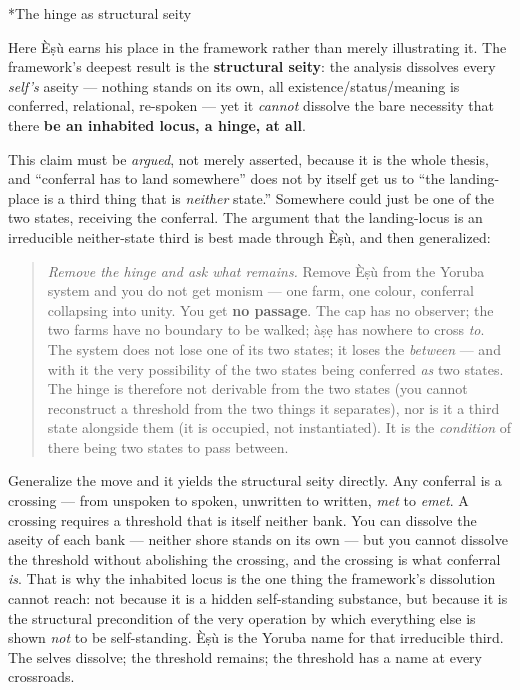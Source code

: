 \documentclass[11pt]{article}
\makeatletter
\renewcommand\paragraph{\@startsection{paragraph}{4}{\z@}{2ex plus 1ex}{0.4ex}{\normalfont\normalsize\bfseries}}
\makeatother
\begin{document}
\paragraph*{The hinge as structural seity}

Here Èṣù earns his place in the framework rather than merely illustrating it. The framework's deepest result is the \textbf{structural seity}: the analysis dissolves every \emph{self's} aseity — nothing stands on its own, all existence/\allowbreak{}status/\allowbreak{}meaning is conferred, relational, re-spoken — yet it \emph{cannot} dissolve the bare necessity that there \textbf{be an inhabited locus, a hinge, at all}.

This claim must be \emph{argued}, not merely asserted, because it is the whole thesis, and ``conferral has to land somewhere'' does not by itself get us to ``the landing-place is a third thing that is \emph{neither} state.'' Somewhere could just be one of the two states, receiving the conferral. The argument that the landing-locus is an irreducible neither-state third is best made through Èṣù, and then generalized:

\begin{quote}
\emph{Remove the hinge and ask what remains.} Remove Èṣù from the Yoruba system and you do not get monism — one farm, one colour, conferral collapsing into unity. You get \textbf{no passage}. The cap has no observer; the two farms have no boundary to be walked; àṣẹ has nowhere to cross \emph{to}. The system does not lose one of its two states; it loses the \emph{between} — and with it the very possibility of the two states being conferred \emph{as} two states. The hinge is therefore not derivable from the two states (you cannot reconstruct a threshold from the two things it separates), nor is it a third state alongside them (it is occupied, not instantiated). It is the \emph{condition} of there being two states to pass between.
\end{quote}

Generalize the move and it yields the structural seity directly. Any conferral is a crossing — from unspoken to spoken, unwritten to written, \emph{met} to \emph{emet}. A crossing requires a threshold that is itself neither bank. You can dissolve the aseity of each bank — neither shore stands on its own — but you cannot dissolve the threshold without abolishing the crossing, and the crossing is what conferral \emph{is}. That is why the inhabited locus is the one thing the framework's dissolution cannot reach: not because it is a hidden self-standing substance, but because it is the structural precondition of the very operation by which everything else is shown \emph{not} to be self-standing. Èṣù is the Yoruba name for that irreducible third. The selves dissolve; the threshold remains; the threshold has a name at every crossroads.
\end{document}
